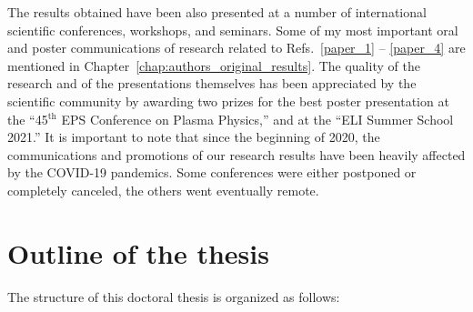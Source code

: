 \documentclass[10pt, a4paper, twoside, openright]{report}
\newcommand{\q}[1]{``#1''} %
\begin{document}

The results obtained have been also presented at a number of international scientific conferences, workshops, and seminars. Some of my most important oral and poster communications of research related to Refs.~\ref{paper_1} -- \ref{paper_4} are mentioned in Chapter~\ref{chap:authors_original_results}. The quality of the research and of the presentations themselves has been appreciated by the scientific community by awarding two prizes for the best poster presentation at the \q{45$ ^{\mathrm{th}} $ EPS Conference on Plasma Physics,} and at the \q{ELI Summer School 2021.} It is important to note that since the beginning of 2020, the communications and promotions of our research results have been heavily affected by the COVID-19 pandemics. Some conferences were either postponed or completely canceled, the others went eventually remote.

\section{Outline of the thesis}
%

The structure of this doctoral thesis is organized as follows: 
\end{document}
